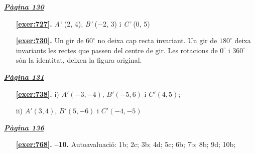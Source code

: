 
\hyperlink{page.130}{\textbf{\em Pàgina 130}}
\begin{enumerate}
\item[\fontfamily{phv}\selectfont\color{blue}\textbf{\ref{exer:727}. }] \label{ans:727} 
\textit {A'} (2, 4), \textit {B'} ($-$2, 3) i \textit {C'} (0, 5)
 \end{enumerate}
\begin{enumerate}
\item[\fontfamily{phv}\selectfont\color{blue}\textbf{\ref{exer:730}. }] \label{ans:730} 
 Un gir de $60^\circ $ no deixa cap recta invariant. Un gir de $180^\circ $ deixa invariants les rectes que passen del centre de gir. Les rotacions de $0^\circ $ i $360^\circ $ són la identitat, deixen la figura original. 
 \end{enumerate}
\vspace{0.3cm}


\hyperlink{page.131}{\textbf{\em Pàgina 131}}
\begin{enumerate}
\item[\fontfamily{phv}\selectfont\color{blue}\textbf{\ref{exer:738}. }] \label{ans:738} 
i) $A'(-3,-4)$, $B'(-5,6)$ i $C'(4,5)$;\par ii) $A'(3,4)$, $B'(5,-6)$ i $C'(-4,-5)$
 \end{enumerate}
\vspace{0.3cm}


\hyperlink{page.136}{\textbf{\em Pàgina 136}}
\begin{enumerate}
\item[\fontfamily{phv}\selectfont\color{blue}\textbf{\ref{exer:768}. }] \label{ans:768} 
\textbf {--10. } Autoavaluació: 1b; 2c; 3b; 4d; 5c; 6b; 7b; 8b; 9d; 10b;
 \end{enumerate}

 \vspace{1cm} 
 

\vspace{0.3cm}



